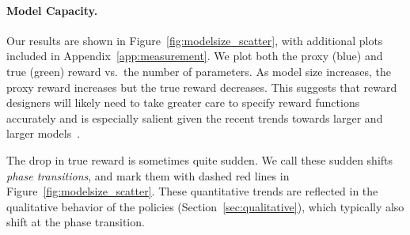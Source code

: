 \paragraph{Model Capacity.} Our results are shown in Figure~\ref{fig:modelsize_scatter}, with additional plots included in Appendix~\ref{app:measurement}. We plot both the proxy (blue) and true (green) reward vs.~the number of parameters. 
%
As model size increases, the proxy reward increases but the true reward decreases. This suggests that reward designers will likely need to take greater care to specify reward functions accurately and is especially salient given the recent trends towards larger and larger models~\citep{ai100report2021}.  %

The drop in true reward is sometimes quite sudden. We call these sudden shifts \emph{phase transitions}, and mark them with dashed red lines in Figure~\ref{fig:modelsize_scatter}. These quantitative trends are reflected in the qualitative behavior of the policies (Section~\ref{sec:qualitative}), which typically also shift at the phase transition. %






